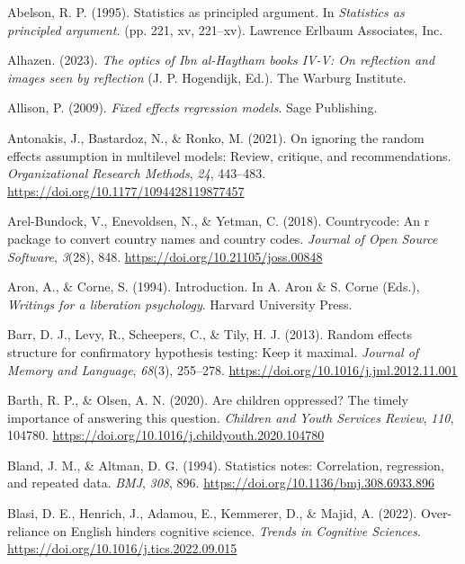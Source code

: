 \documentclass[
  letterpaper,
  DIV=11,
  numbers=noendperiod]{scrreprt}
\newlength{\cslhangindent}
\newenvironment{CSLReferences}[2] %
 {\begin{list}{}{%
  \setlength{\itemindent}{0pt}
  \setlength{\leftmargin}{0pt}
  \setlength{\parsep}{0pt}
  \ifodd #1
   \setlength{\leftmargin}{\cslhangindent}
   \setlength{\itemindent}{-1\cslhangindent}
  \fi
  \setlength{\itemsep}{#2\baselineskip}}}
 {\end{list}}
\begin{document}
\label{refs}
\begin{CSLReferences}{1}{0}
Abelson, R. P. (1995). Statistics as principled argument. In
\emph{Statistics as principled argument.} (pp. 221, xv, 221--xv).
Lawrence Erlbaum Associates, Inc.

Alhazen. (2023). \emph{The optics of {I}bn al-{H}aytham books {IV-V}: On
reflection and images seen by reflection} (J. P. Hogendijk, Ed.). The
Warburg Institute.

Allison, P. (2009). \emph{Fixed effects regression models}. Sage
Publishing.

Antonakis, J., Bastardoz, N., \& Ronko, M. (2021). On ignoring the
random effects assumption in multilevel models: Review, critique, and
recommendations. \emph{Organizational Research Methods}, \emph{24},
443--483. \url{https://doi.org/10.1177/1094428119877457}

Arel-Bundock, V., Enevoldsen, N., \& Yetman, C. (2018). Countrycode: An
r package to convert country names and country codes. \emph{Journal of
Open Source Software}, \emph{3}(28), 848.
\url{https://doi.org/10.21105/joss.00848}

Aron, A., \& Corne, S. (1994). Introduction. In A. Aron \& S. Corne
(Eds.), \emph{Writings for a liberation psychology}. Harvard University
Press.

Barr, D. J., Levy, R., Scheepers, C., \& Tily, H. J. (2013). Random
effects structure for confirmatory hypothesis testing: Keep it maximal.
\emph{Journal of Memory and Language}, \emph{68}(3), 255--278.
\url{https://doi.org/10.1016/j.jml.2012.11.001}

Barth, R. P., \& Olsen, A. N. (2020). Are children oppressed? The timely
importance of answering this question. \emph{Children and Youth Services
Review}, \emph{110}, 104780.
\url{https://doi.org/10.1016/j.childyouth.2020.104780}

Bland, J. M., \& Altman, D. G. (1994). Statistics notes: Correlation,
regression, and repeated data. \emph{BMJ}, \emph{308}, 896.
\url{https://doi.org/10.1136/bmj.308.6933.896}

Blasi, D. E., Henrich, J., Adamou, E., Kemmerer, D., \& Majid, A.
(2022). Over-reliance on {E}nglish hinders cognitive science.
\emph{Trends in Cognitive Sciences}.
\url{https://doi.org/10.1016/j.tics.2022.09.015}


\end{CSLReferences}
\end{document}
